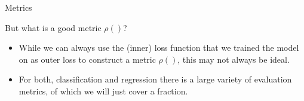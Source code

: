 \documentclass[11pt,compress,t,notes=noshow, xcolor=table]{beamer}
\begin{document}
\begin{vbframe}{Metrics}

But what is a good metric $\rho()$?


\begin{itemize}
\item %
While we can always use the (inner) loss function that we trained the model on as outer loss to construct a metric $\rho()$, this may not always be ideal.
\item For both, classification and regression there is a large variety of evaluation metrics, of which we will just cover a fraction.
\end{itemize}






\end{vbframe}







\end{document}
